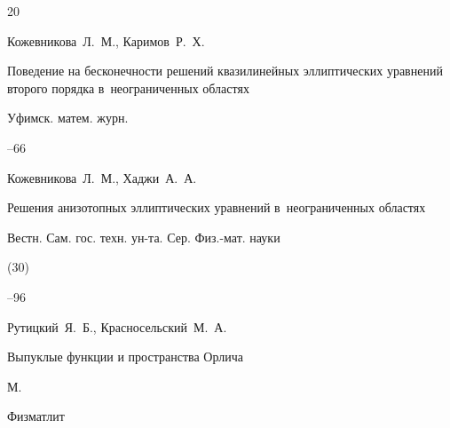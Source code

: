 \begin{thebibliography}{20}




\by Кожевникова~Л.~М., Каримов~Р.~Х.

\paper Поведение на бесконечности решений квазилинейных эллиптических уравнений второго порядка в~неограниченных областях

\jour Уфимск. матем. журн.




--66






\by Кожевникова~Л.~М., Хаджи~А.~А.

\paper Решения анизотопных эллиптических уравнений в~неограниченных областях

\jour Вестн. Сам. гос. техн. ун-та. Сер. Физ.-мат. науки


(30)

--96








\by Рутицкий~Я.~Б., Красносельский~М.~А.

\book Выпуклые функции и пространства Орлича

\publaddr М.

\publ  Физматлит













\end{thebibliography}
